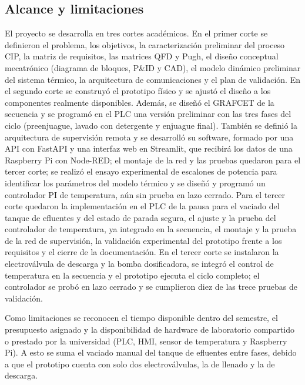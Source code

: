 \subsection{Alcance y limitaciones}
{El proyecto se desarrolla en tres cortes académicos. En el primer corte se definieron el problema, los objetivos, la caracterización preliminar del proceso CIP, la matriz de requisitos, las matrices QFD y Pugh, el diseño conceptual mecatrónico (diagrama de bloques, P\&ID y CAD), el modelo dinámico preliminar del sistema térmico, la arquitectura de comunicaciones y el plan de validación. En el segundo corte se construyó el prototipo físico y se ajustó el diseño a los componentes realmente disponibles. Además, se diseñó el GRAFCET de la secuencia y se programó en el PLC una versión preliminar con las tres fases del ciclo (preenjuague, lavado con detergente y enjuague final). También se definió la arquitectura de supervisión remota y se desarrolló su software, formado por una API con FastAPI y una interfaz web en Streamlit, que recibirá los datos de una Raspberry Pi con Node-RED; el montaje de la red y las pruebas quedaron para el tercer corte; se realizó el ensayo experimental de escalones de potencia para identificar los parámetros del modelo térmico y se diseñó y programó un controlador PI de temperatura, aún sin prueba en lazo cerrado. Para el tercer corte quedaron la implementación en el PLC de la pausa para el vaciado del tanque de efluentes y del estado de parada segura, el ajuste y la prueba del controlador de temperatura, ya integrado en la secuencia, el montaje y la prueba de la red de supervisión, la validación experimental del prototipo frente a los requisitos y el cierre de la documentación. En el tercer corte se instalaron la electroválvula de descarga y la bomba dosificadora, se integró el control de temperatura en la secuencia y el prototipo ejecuta el ciclo completo; el controlador se probó en lazo cerrado y se cumplieron diez de las trece pruebas de validación.

Como limitaciones se reconocen el tiempo disponible dentro del semestre, el presupuesto asignado y la disponibilidad de hardware de laboratorio compartido o prestado por la universidad (PLC, HMI, sensor de temperatura y Raspberry Pi). A esto se suma el vaciado manual del tanque de efluentes entre fases, debido a que el prototipo cuenta con solo dos electroválvulas, la de llenado y la de descarga.}
